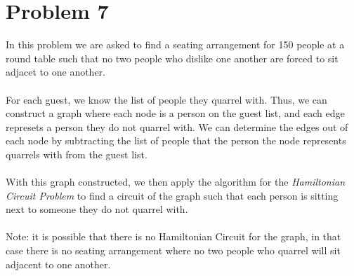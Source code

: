 \section*{Problem 7}

In this problem we are asked to find a seating arrangement for 150 people at a 
round table such that no two people who dislike one another are forced to sit
adjacet to one another.
\\
\\
For each guest, we know the list of people they quarrel with. Thus, we can 
construct a graph where each node is a person on the guest list, and each edge
represets a person they do not quarrel with. We can determine the edges out of
each node by subtracting the list of people that the person the node represents
quarrels with from the guest list.
\\
\\
With this graph constructed, we then apply the algorithm for the 
\textit{Hamiltonian Circuit Problem} to find a circuit of the graph such that
each person is sitting next to someone they do not quarrel with.
\\
\\
Note: it is possible that there is no Hamiltonian Circuit for the graph, in
that case there is no seating arrangement where no two people who quarrel will
sit adjacent to one another. 
